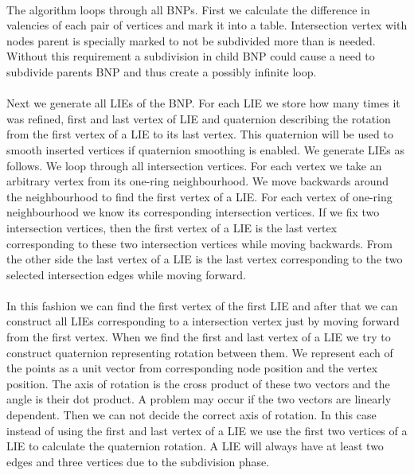 \paragraph{}
The algorithm loops through all BNPs. First we calculate the difference in valencies of each pair of vertices and mark it into a table. Intersection vertex with nodes parent is specially marked to not be subdivided more than is needed. Without this requirement a subdivision in child BNP could cause a need to subdivide parents BNP and thus create a possibly infinite loop.
\paragraph{}
Next we generate all LIEs of the BNP. For each LIE we store how many times it was refined, first and last vertex of LIE and quaternion describing the rotation from the first vertex of a LIE to its last vertex. This quaternion will be used to smooth inserted vertices if quaternion smoothing is enabled. We generate LIEs as follows. We loop through all intersection vertices. For each vertex we take an arbitrary vertex from its one-ring neighbourhood. We move backwards around the neighbourhood to find the first vertex of a LIE. For each vertex of one-ring neighbourhood we know its corresponding intersection vertices. If we fix two intersection vertices, then the first vertex of a LIE is the last vertex corresponding to these two intersection vertices while moving backwards. From the other side the last vertex of a LIE is the last vertex corresponding to the two selected intersection edges while moving forward.
\paragraph{}
In this fashion we can find the first vertex of the first LIE and after that we can construct all LIEs corresponding to a intersection vertex just by moving forward from the first vertex. When we find the first and last vertex of a LIE we try to construct quaternion representing rotation between them. We represent each of the points as a unit vector from corresponding node position and the vertex position. The axis of rotation is the cross product of these two vectors and the angle is their dot product. A problem may occur if the two vectors are linearly dependent. Then we can not decide the correct axis of rotation. In this case instead of using the first and last vertex of a LIE we use the first two vertices of a LIE to calculate the quaternion rotation. A LIE will always have at least two edges and three vertices due to the subdivision phase.
